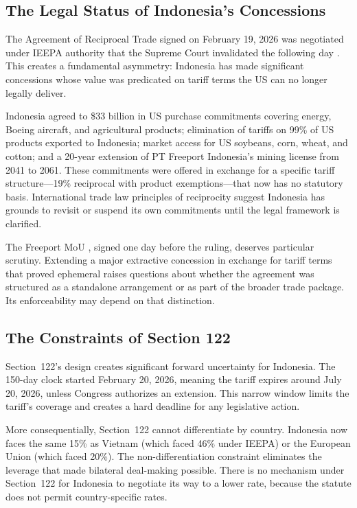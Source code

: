 \documentclass[12pt,a4paper]{article}
\begin{document}
\subsection{The Legal Status of Indonesia's Concessions}

The Agreement of Reciprocal Trade signed on February 19, 2026 \cite{art2026} was negotiated under IEEPA authority that the Supreme Court invalidated the following day \cite{scotus2026}. This creates a fundamental asymmetry: Indonesia has made significant concessions whose value was predicated on tariff terms the US can no longer legally deliver.

Indonesia agreed to \$33 billion in US purchase commitments covering energy, Boeing aircraft, and agricultural products; elimination of tariffs on 99\% of US products exported to Indonesia; market access for US soybeans, corn, wheat, and cotton; and a 20-year extension of PT Freeport Indonesia's mining license from 2041 to 2061. These commitments were offered in exchange for a specific tariff structure---19\% reciprocal with product exemptions---that now has no statutory basis. International trade law principles of reciprocity suggest Indonesia has grounds to revisit or suspend its own commitments until the legal framework is clarified.

The Freeport MoU \cite{freeport_mou}, signed one day before the ruling, deserves particular scrutiny. Extending a major extractive concession in exchange for tariff terms that proved ephemeral raises questions about whether the agreement was structured as a standalone arrangement or as part of the broader trade package. Its enforceability may depend on that distinction.

\subsection{The Constraints of Section 122}

Section~122's design creates significant forward uncertainty for Indonesia. The 150-day clock started February 20, 2026, meaning the tariff expires around July 20, 2026, unless Congress authorizes an extension. This narrow window limits the tariff's coverage and creates a hard deadline for any legislative action.

More consequentially, Section~122 cannot differentiate by country. Indonesia now faces the same 15\% as Vietnam (which faced 46\% under IEEPA) or the European Union (which faced 20\%). The non-differentiation constraint eliminates the leverage that made bilateral deal-making possible. There is no mechanism under Section~122 for Indonesia to negotiate its way to a lower rate, because the statute does not permit country-specific rates.
\end{document}
